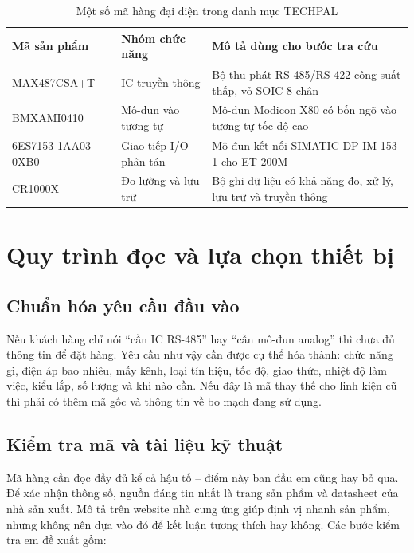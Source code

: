 \begin{table}[H]
\centering
\caption{Một số mã hàng đại diện trong danh mục TECHPAL}
\label{tab:representative-products}
\small
\renewcommand{\arraystretch}{1.1}
\begin{tabularx}{\textwidth}{>{\ttfamily\raggedright\arraybackslash}p{4.1cm} >{\raggedright\arraybackslash}p{2.8cm} >{\raggedright\arraybackslash}X}
\toprule
\normalfont\textbf{Mã sản phẩm} & \textbf{Nhóm chức năng} & \textbf{Mô tả dùng cho bước tra cứu} \\
\midrule
MAX487CSA+T & IC truyền thông & Bộ thu phát RS-485/RS-422 công suất thấp, vỏ SOIC 8 chân \\
BMXAMI0410 & Mô-đun vào tương tự & Mô-đun Modicon X80 có bốn ngõ vào tương tự tốc độ cao \\
6ES7153-1AA03-0XB0 & Giao tiếp I/O phân tán & Mô-đun kết nối SIMATIC DP IM 153-1 cho ET 200M \\
CR1000X & Đo lường và lưu trữ & Bộ ghi dữ liệu có khả năng đo, xử lý, lưu trữ và truyền thông \\
\bottomrule
\end{tabularx}
\end{table}

\section{Quy trình đọc và lựa chọn thiết bị}

\subsection{Chuẩn hóa yêu cầu đầu vào}

Nếu khách hàng chỉ nói ``cần IC RS-485'' hay ``cần mô-đun analog'' thì chưa đủ
thông tin để đặt hàng. Yêu cầu như vậy cần được cụ thể hóa thành: chức năng gì,
điện áp bao nhiêu, mấy kênh, loại tín hiệu, tốc độ, giao thức, nhiệt độ làm
việc, kiểu lắp, số lượng và khi nào cần. Nếu đây là mã thay thế cho linh kiện
cũ thì phải có thêm mã gốc và thông tin về bo mạch đang sử dụng.

\subsection{Kiểm tra mã và tài liệu kỹ thuật}

Mã hàng cần đọc đầy đủ kể cả hậu tố -- điểm này ban đầu em cũng hay bỏ qua.
Để xác nhận thông số, nguồn đáng tin nhất là trang sản phẩm và datasheet của nhà
sản xuất. Mô tả trên website nhà cung ứng giúp định vị nhanh sản phẩm, nhưng
không nên dựa vào đó để kết luận tương thích hay không. Các bước kiểm tra em đề
xuất gồm:

